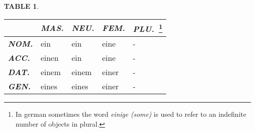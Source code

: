 \documentclass[a4paper,twocolumn,10pt]{article}
\newtheorem{mytable}{TABLE}[section]
\begin{document}
\linenumbers



\nolinenumbers

\begin{table-bg}[width=\linewidth]{}

	\begin{table-title}[width=6.5cm]{}
		\captionsetup{labelformat=empty}
	\end{table-title}

	\begin{table-theword}
		\footnotesize \begin{mytable}\label{table:cases_indefinite_articles} \end{mytable}
	\end{table-theword}

	\begin{table-content}
	\begin{tabularx}
		{\textwidth}{l|XXXX}

		&
		\cellcolor{lightgray} \textbf{\textit{MAS.}} &
		\cellcolor{lightgray} \textbf{\textit{NEU.}}  &
		\cellcolor{lightgray} \textbf{\textit{FEM.}}  &
		\cellcolor{lightgray} \textbf{\textit{PLU.}}~\footnote{In german
			sometimes the word \textit{einige (some) } is used to refer to an indefinite
number of objects in plural.} \\

\midrule

\cellcolor{lightgray} \textbf{\textit{NOM.}} &
\cellcolor{cell-lightpurple}  ein            &
\cellcolor{cell-lightorange}  ein            &
\cellcolor{cell-lightblue} eine              &
\cellcolor{table-bg} - \\

\cellcolor{lightgray} \textbf{\textit{ACC.}} &
\cellcolor{cell-lightgreen} einen            &
\cellcolor{cell-lightorange}  ein            &
\cellcolor{cell-lightblue}  eine             &
\cellcolor{table-bg} - \\

\cellcolor{lightgray} \textbf{\textit{DAT.}} &
\cellcolor{cell-lightred} einem              &
\cellcolor{cell-lightred} einem              &
\cellcolor{cell-lightpurple} einer           &
\cellcolor{table-bg} - \\

\cellcolor{lightgray} \textbf{\textit{GEN.}} &
\cellcolor{cell-lightyellow} eines           &
\cellcolor{cell-lightyellow} eines           &
\cellcolor{cell-lightpurple} einer           &
\cellcolor{table-bg} - \\

	\end{tabularx}
	\end{table-content}

\end{table-bg}
\end{document}

